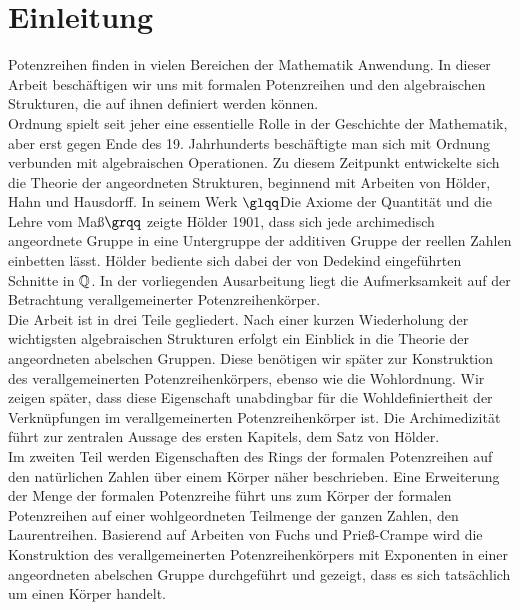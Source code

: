 \chapter{Einleitung}
%
Potenzreihen finden in vielen Bereichen der Mathematik Anwendung. In dieser Arbeit beschäftigen wir uns mit formalen Potenzreihen und den algebraischen Strukturen, die auf ihnen definiert werden können. \\
Ordnung spielt seit jeher eine essentielle Rolle in der Geschichte der Mathematik, aber erst gegen Ende des 19. Jahrhunderts beschäftigte man sich mit Ordnung verbunden mit algebraischen Operationen. Zu diesem Zeitpunkt entwickelte sich die Theorie der angeordneten Strukturen, beginnend mit Arbeiten von Hölder, Hahn und Hausdorff. In seinem Werk $\glqq$Die Axiome der Quantität und die Lehre vom Maß$\grqq$ zeigte Hölder 1901, dass sich jede archimedisch angeordnete Gruppe in eine Untergruppe der additiven Gruppe der reellen Zahlen einbetten lässt. Hölder bediente sich dabei der von Dedekind eingeführten Schnitte in $\mathbb{Q}$. 
In der vorliegenden Ausarbeitung liegt die Aufmerksamkeit auf der Betrachtung verallgemeinerter Potenzreihenkörper.   \\
Die Arbeit ist in drei Teile gegliedert. Nach einer kurzen Wiederholung der wichtigsten algebraischen Strukturen erfolgt ein Einblick in die Theorie der angeordneten abelschen Gruppen. Diese benötigen wir später zur Konstruktion des verallgemeinerten Potenzreihenkörpers, ebenso wie die Wohlordnung. Wir zeigen später, dass diese Eigenschaft unabdingbar für die Wohldefiniertheit der Verknüpfungen im verallgemeinerten Potenzreihenkörper ist. Die Archimedizität führt zur zentralen Aussage des ersten Kapitels, dem Satz von Hölder. \\
Im zweiten Teil werden Eigenschaften des Rings der formalen Potenzreihen auf den natürlichen Zahlen über einem Körper näher beschrieben. Eine Erweiterung der Menge der formalen Potenzreihe führt uns zum Körper der formalen Potenzreihen auf einer wohlgeordneten Teilmenge der ganzen Zahlen, den Laurentreihen. Basierend auf Arbeiten von Fuchs und Prieß-Crampe wird die Konstruktion des verallgemeinerten Potenzreihenkörpers mit Exponenten in einer angeordneten abelschen Gruppe durchgeführt und gezeigt, dass es sich tatsächlich um einen Körper handelt.




%
%
%
